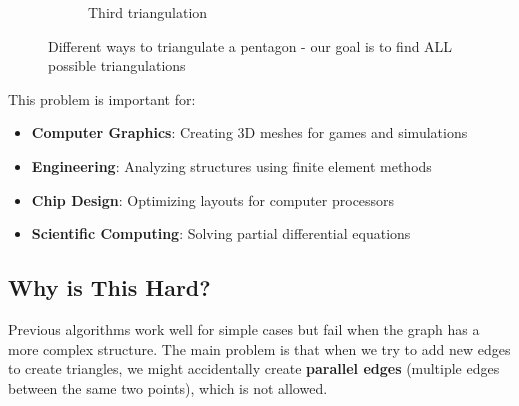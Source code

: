 \documentclass[12pt,a4paper]{article}
\begin{document}
\begin{figure}[h]
\begin{subfigure}{0.45\textwidth}
\caption{Third triangulation}
\end{subfigure}

\caption{Different ways to triangulate a pentagon - our goal is to find ALL possible triangulations}
\end{figure}

This problem is important for:
\begin{itemize}
\item \textbf{Computer Graphics}: Creating 3D meshes for games and simulations
\item \textbf{Engineering}: Analyzing structures using finite element methods
\item \textbf{Chip Design}: Optimizing layouts for computer processors
\item \textbf{Scientific Computing}: Solving partial differential equations
\end{itemize}

\subsection{Why is This Hard?}

Previous algorithms work well for simple cases but fail when the graph has a more complex structure. The main problem is that when we try to add new edges to create triangles, we might accidentally create \textbf{parallel edges} (multiple edges between the same two points), which is not allowed.
\end{document}
